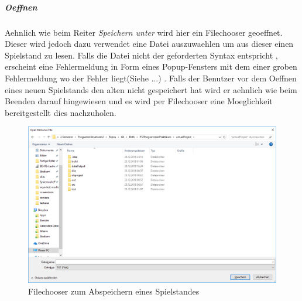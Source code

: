 \subparagraph{Oeffnen}
Aehnlich wie beim Reiter \emph{Speichern unter} wird hier ein Filechooser geoeffnet. Dieser wird jedoch dazu verwendet eine Datei auszuwaehlen um aus dieser einen Spielstand zu lesen. Falls die Datei nicht der geforderten Syntax entspricht , erscheint eine Fehlermeldung in Form eines Popup-Fensters mit dem einer groben Fehlermeldung wo der Fehler liegt(Siehe ...) 
. Falls der Benutzer vor dem Oeffnen eines neuen Spielstands den alten nicht gespeichert hat wird er aehnlich wie beim Beenden darauf hingewiesen und es wird per Filechooser eine Moeglichkeit bereitgestellt dies nachzuholen.

\begin{figure}
	\centering
	\includegraphics{screenshots/screenshot_Filechooser}
	\caption[Filechooser]{Filechooser zum Abspeichern eines Spielstandes}
	\label{fig:filechooser}
\end{figure}

